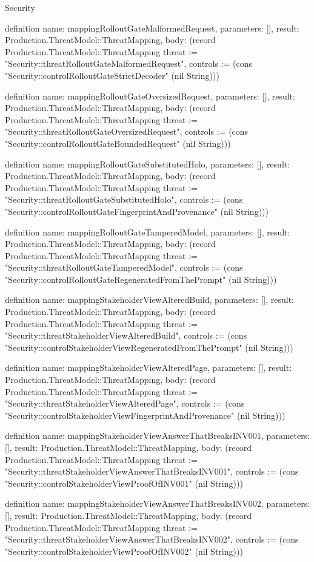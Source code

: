\begin{lexlean}{Security}
\begin{semanticmodule}
definition{
  name: mappingRolloutGateMalformedRequest,
  parameters: [],
  result: Production.ThreatModel::ThreatMapping,
  body: (record Production.ThreatModel::ThreatMapping {threat := "Security::threatRolloutGateMalformedRequest", controls := (cons "Security::controlRolloutGateStrictDecoder" (nil String))})
}

definition{
  name: mappingRolloutGateOversizedRequest,
  parameters: [],
  result: Production.ThreatModel::ThreatMapping,
  body: (record Production.ThreatModel::ThreatMapping {threat := "Security::threatRolloutGateOversizedRequest", controls := (cons "Security::controlRolloutGateBoundedRequest" (nil String))})
}

definition{
  name: mappingRolloutGateSubstitutedHolo,
  parameters: [],
  result: Production.ThreatModel::ThreatMapping,
  body: (record Production.ThreatModel::ThreatMapping {threat := "Security::threatRolloutGateSubstitutedHolo", controls := (cons "Security::controlRolloutGateFingerprintAndProvenance" (nil String))})
}

definition{
  name: mappingRolloutGateTamperedModel,
  parameters: [],
  result: Production.ThreatModel::ThreatMapping,
  body: (record Production.ThreatModel::ThreatMapping {threat := "Security::threatRolloutGateTamperedModel", controls := (cons "Security::controlRolloutGateRegeneratedFromThePrompt" (nil String))})
}

definition{
  name: mappingStakeholderViewAlteredBuild,
  parameters: [],
  result: Production.ThreatModel::ThreatMapping,
  body: (record Production.ThreatModel::ThreatMapping {threat := "Security::threatStakeholderViewAlteredBuild", controls := (cons "Security::controlStakeholderViewRegeneratedFromThePrompt" (nil String))})
}

definition{
  name: mappingStakeholderViewAlteredPage,
  parameters: [],
  result: Production.ThreatModel::ThreatMapping,
  body: (record Production.ThreatModel::ThreatMapping {threat := "Security::threatStakeholderViewAlteredPage", controls := (cons "Security::controlStakeholderViewFingerprintAndProvenance" (nil String))})
}

definition{
  name: mappingStakeholderViewAnswerThatBreaksINV001,
  parameters: [],
  result: Production.ThreatModel::ThreatMapping,
  body: (record Production.ThreatModel::ThreatMapping {threat := "Security::threatStakeholderViewAnswerThatBreaksINV001", controls := (cons "Security::controlStakeholderViewProofOfINV001" (nil String))})
}

definition{
  name: mappingStakeholderViewAnswerThatBreaksINV002,
  parameters: [],
  result: Production.ThreatModel::ThreatMapping,
  body: (record Production.ThreatModel::ThreatMapping {threat := "Security::threatStakeholderViewAnswerThatBreaksINV002", controls := (cons "Security::controlStakeholderViewProofOfINV002" (nil String))})
}


\end{semanticmodule}
\end{lexlean}
